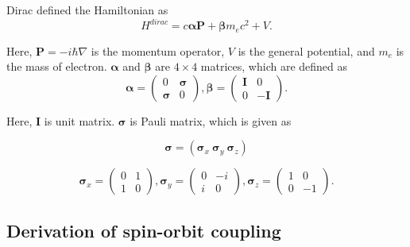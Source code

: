 \documentclass[a4paper, 12pt, titlepage,oneside,drop]{kthesis}
\begin{document}
\noindent Dirac defined the Hamiltonian as
\begin{equation}\label{dirac}
{H}^{dirac} = c \boldsymbol{\alpha} \textbf{P} + \boldsymbol{\beta}m_ec^{2} + V.
\end{equation}

\noindent Here, $\textbf{P} = -i\hbar \nabla $ is the momentum operator, $V$ is the general potential, and $m_e$ is the mass of electron. 
 $\boldsymbol{\alpha}$ and $\boldsymbol{\beta}$ are $4 \times 4$ matrices, which are defined as
\begin{equation}
 \boldsymbol{\alpha} = \left( \begin{array}{cc}
 0 & \boldsymbol{\sigma}  \\
 \boldsymbol{\sigma} & 0   \end{array} \right),
\boldsymbol{\beta} = \left( \begin{array}{ccc}
\boldsymbol{I} & 0\\
0 & -\boldsymbol{I}\end{array} \right).
\end{equation}

\noindent Here, $\boldsymbol{I}$ is unit matrix. $\boldsymbol{\sigma}$ is Pauli matrix, which is given as

\begin{equation} 
\boldsymbol{\sigma} = (\boldsymbol{\sigma}_x \  \boldsymbol{\sigma}_y \  \boldsymbol{\sigma}_z )  
\end{equation}

\begin{equation}
\boldsymbol{\sigma}_x = \left( \begin{array}{cc}
0 & 1\\
1 & 0\end{array} \right),
\boldsymbol{\sigma}_y = \left( \begin{array}{ccc}
0 & -i\\
i & 0\end{array} \right),
\boldsymbol{\sigma}_z = \left( \begin{array}{ccc}
1 & 0\\
0 & -1\end{array} \right).
\end{equation}

\subsection{Derivation of spin-orbit coupling}
\end{document}
